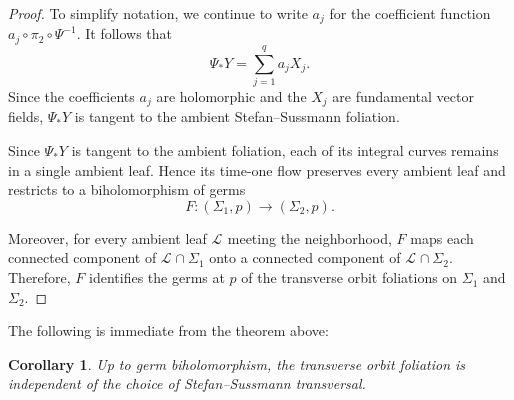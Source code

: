 \documentclass[11pt]{amsart}
\newtheorem{corollary}[theorem]{Corollary}
\theoremstyle{definition}
\theoremstyle{remark}
\newcommand{\leaf}[1]{\mathcal{L}_{#1}}
\begin{document}
\begin{proof}
 

To simplify notation, we continue to write $a_j$ for the coefficient
function $a_j\circ\pi_2\circ\Psi^{-1}$. It follows that
\[
    \Psi_*Y=\sum_{j=1}^q a_jX_j.
\]
Since the coefficients $a_j$ are holomorphic and the $X_j$ are
fundamental vector fields, $\Psi_*Y$ is tangent to the ambient
Stefan--Sussmann foliation.

	
Since $\Psi_*Y$ is tangent to the ambient foliation, each of its
integral curves remains in a single ambient leaf. Hence its time-one
flow preserves every ambient leaf and restricts to a biholomorphism of
germs
\[
    F:(\Sigma_1,p)\longrightarrow(\Sigma_2,p).
\]

Moreover, for every ambient leaf $\leaf{}$ meeting the neighborhood,
$F$ maps each connected component of $\leaf{}\cap\Sigma_1$ onto a
connected component of $\leaf{}\cap\Sigma_2$. Therefore, $F$ identifies
the germs at $p$ of the transverse orbit foliations on $\Sigma_1$ and
$\Sigma_2$.	
\end{proof}

The following is immediate from the theorem above:

\begin{corollary}
	Up to germ biholomorphism, the transverse orbit foliation is independent of the choice of Stefan--Sussmann transversal.
\end{corollary}

\bigskip
\end{document}
